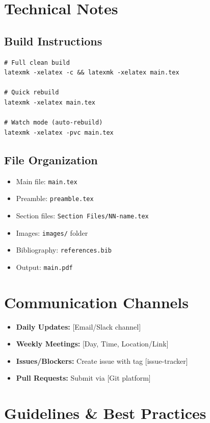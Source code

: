 \documentclass[12pt]{article}
\begin{document}
\section*{Technical Notes}

\subsection*{Build Instructions}
\begin{verbatim}
# Full clean build
latexmk -xelatex -c && latexmk -xelatex main.tex

# Quick rebuild
latexmk -xelatex main.tex

# Watch mode (auto-rebuild)
latexmk -xelatex -pvc main.tex
\end{verbatim}

\subsection*{File Organization}
\begin{itemize}
    \item Main file: \texttt{main.tex}
    \item Preamble: \texttt{preamble.tex}
    \item Section files: \texttt{Section Files/NN-name.tex}
    \item Images: \texttt{images/} folder
    \item Bibliography: \texttt{references.bib}
    \item Output: \texttt{main.pdf}
\end{itemize}

\section*{Communication Channels}

\begin{itemize}
    \item \textbf{Daily Updates:} [Email/Slack channel]
    \item \textbf{Weekly Meetings:} [Day, Time, Location/Link]
    \item \textbf{Issues/Blockers:} Create issue with tag [issue-tracker]
    \item \textbf{Pull Requests:} Submit via [Git platform]
\end{itemize}

\section*{Guidelines \& Best Practices}
\end{document}

